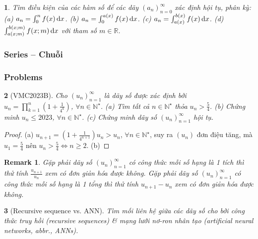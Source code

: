 \documentclass{article}
\newtheorem{baitoan}{}
\newtheorem{remark}{Remark}
\begin{document}
\begin{baitoan}
	Tìm điều kiện của các hàm số để các dãy $(a_n)_{n=0}^\infty$ xác định hội tụ, phân kỳ: (a) $a_n = \int_0^n f(x)\,{\rm d}x$. (b) $a_n = \int_0^{a(x)} f(x)\,{\rm d}x$. (c) $a_n = \int_{a(x)}^{b(x)} f(x)\,{\rm d}x$. (d) $\int_{a(x;m)}^{b(x;m)} f(x;m)\,{\rm d}x$ với tham số $m\in\mathbb{R}$.
\end{baitoan}


\subsubsection{Series -- Chuỗi}


\subsubsection{Problems}

\begin{baitoan}[VMC2023B]
	Cho $(u_n)_{n=1}^\infty$ là dãy số được xác định bởi $u_n = \prod_{k=1}^n \left(1 + \frac{1}{4^k}\right)$, $\forall n\in\mathbb{N}^\star$. (a) Tìm tất cả $n\in\mathbb{N}^\star$ thỏa $u_n > \frac{5}{4}$. (b) Chứng minh $u_n\le2023$, $\forall n\in\mathbb{N}^\star$. (c) Chứng minh dãy số $(u_n)_{n=1}^\infty$ hội tụ.
\end{baitoan}

\begin{proof}
	(a) $u_{n+1} = \left(1 + \frac{1}{4^{n+1}}\right)u_n > u_n$, $\forall n\in\mathbb{N}^\star$, suy ra $(u_n)$ đơn điệu tăng, mà $u_1 = \frac{5}{4}$ nên $u_n > \frac{5}{4}\Leftrightarrow n\ge2$. (b)
\end{proof}

\begin{remark}
	Gặp phải dãy số $(u_n)_{n=1}^\infty$ có công thức mỗi số hạng là 1 tích thì thử tính $\frac{u_{n+1}}{u_n}$ xem có đơn giản hóa được không. Gặp phải dãy số $(u_n)_{n=1}^\infty$ có công thức mỗi số hạng là 1 tổng thì thử tính $u_{n+1} - u_n$ xem có đơn giản hóa được không.
\end{remark}

\begin{baitoan}[Recursive sequence vs. ANN]
	Tìm mối liên hệ giữa các dãy số cho bởi công thức truy hồi (recursive sequences) \& mạng lưới nơ-ron nhân tạo (artificial neural networks, abbr., ANNs).
\end{baitoan}
\end{document}

